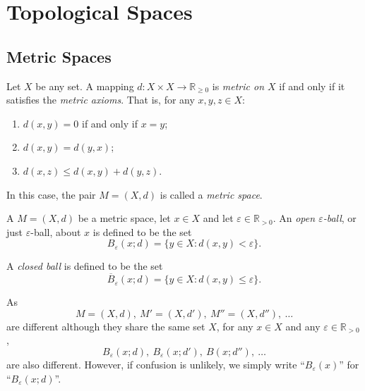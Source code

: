 \tableofcontents



\chapter{Topological Spaces}


\section{Metric Spaces}


\begin{definition}
	\label{definition: metric space}
	Let $X$ be any set. A mapping $d: X \times X \to \mathbb R_{\ge 0}$ is \textit{metric on $X$} if and only if it satisfies the \textit{metric axioms}. That is, for any $x, y, z \in X$:
	\begin{enumerate}[\bf M1. ]
		\item $d(x,y) = 0$ if and only if $x = y$;
		\item $d(x,y) = d(y,x)$;
		\item $d(x, z) \le d(x,y) + d(y,z)$.
	\end{enumerate}
	
	In this case, the pair $M = (X, d)$ is called a \textit{metric space}.
\end{definition}


\begin{definition}
	A $M = (X, d)$ be a metric space, let $x \in X$ and let $\varepsilon \in \mathbb R_{> 0}$. An \textit{open $\varepsilon$-ball}, or just $\varepsilon$-ball, about $x$ is defined to be the set
	$$
	B_\varepsilon (x; d) = \{ y \in X : d(x,y) < \varepsilon \}.
	$$
	
	A \textit{closed ball} is defined to be the set
	$$
	\overline{B}_\varepsilon (x; d) = \{ y \in X : d(x,y) \le \varepsilon \}.
	$$
\end{definition}


\begin{note}
	As
	$$
	M = (X, d), \ M' = (X, d'), \ M'' = (X, d''), \ \ldots
	$$
	are different although they share the same set $X$, for any $x \in X$ and any $\varepsilon \in \mathbb R_{> 0}$,
	$$
	B_\varepsilon(x; d),\ B_\varepsilon (x; d'), \ B(x; d''), \ \ldots
	$$
	are also different. However, if confusion is unlikely, we simply write ``$B_\varepsilon(x)$'' for ``$B_\varepsilon(x; d)$''.
\end{note}


